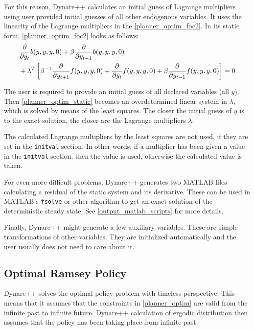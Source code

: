 \documentclass[10pt]{article}
\begin{document}
For this reason, Dynare++ calculates an initial guess of Lagrange
multipliers using user provided initial guesses of all other
endogenous variables. It uses the linearity of the Lagrange
multipliers in the \eqref{planner_optim_foc2}. In its static form,
\eqref{planner_optim_foc2} looks as follows:
\begin{align}
&\frac{\partial}{\partial y_t}b(y,y,y,0)+
\beta\frac{\partial}{\partial y_{t-1}}b(y,y,y,0)\notag\\
&+\lambda^T\left[\beta^{-1}\frac{\partial}{\partial y_{t+1}}f(y,y,y,0)
 +\frac{\partial}{\partial y_{t}}f(y,y,y,0)
 +\beta\frac{\partial}{\partial y_{t-1}}f(y,y,y,0)\right]
 = 0\label{planner_optim_static}
\end{align}

The user is required to provide an initial guess of all declared
variables (all $y$). Then \eqref{planner_optim_static} becomes an
overdetermined linear system in $\lambda$, which is solved by means of
the least squares. The closer the initial guess of $y$ is to the exact
solution, the closer are the Lagrange multipliers $\lambda$.

The calculated Lagrange multipliers by the least squares are not used,
if they are set in the {\tt initval} section. In other words, if a
multiplier has been given a value in the {\tt initval} section, then
the value is used, otherwise the calculated value is taken.

For even more difficult problems, Dynare++ generates two MATLAB files
calculating a residual of the static system and its derivative. These
can be used in MATLAB's {\tt fsolve} or other algorithm to get an
exact solution of the deterministic steady state. See
\ref{output_matlab_scripts} for more details.

Finally, Dynare++ might generate a few auxiliary variables. These are
simple transformations of other variables. They are initialized
automatically and the user usually does not need to care about it.

\subsection{Optimal Ramsey Policy}
\label{ramsey}

Dynare++ solves the optimal policy problem with timeless
perspective. This means that it assumes that the constraints in
\eqref{planner_optim} are valid from the infinite past to infinite
future. Dynare++ calculation of ergodic distribution then assumes that
the policy has been taking place from infinite past.
\end{document}
